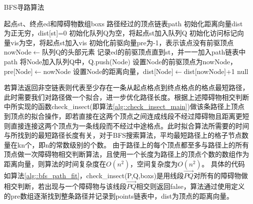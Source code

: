 \begin{algorithm}[!htb]
    \caption{BFS寻路算法}
    \label{alg::bfs_find_path}
    \begin{algorithmic}[1]
        \Require 起点st、终点ed和障碍物数组boxs
        \Ensure 路径经过的顶点链表path
            \State 初始化距离向量dist为正无穷，dist[st]=0
            \State 初始化队列Q为空，将起点st加入队列Q
            \State 初始化访问标记向量vis为空，将起点st加入vis
            \State 初始化前驱向量pre为-1，表示该点没有前驱顶点
                \State nowNode$\gets$队列Q的头部元素
                    \State 记录ed的前驱顶点直到st，并一一加入path链表中
                    \State \Return path
                \EndIf
                        \State 将Node加入队列Q中，Q.push(Node)
                        \State 设置Node的前驱顶点为nowNode，pre[Node]$\gets$nowNode
                        \State 设置Node的距离向量，dist[Node]$\gets$dist[nowNode]+1
                    \EndIf
                \EndWhile
            \EndWhile
            \State \Return null
        \EndFunction
    \end{algorithmic}
\end{algorithm}
\par 若算法返回非空链表则代表至少存在一条从起点格点到终点格点的格点最短路径，此时需要我们对路径做一个拟合，进一步优化路径长度。根据上述障碍物相交判断中所实现的函数check\_insect(即算法\ref{alg::check_insect_main})做该条路径上顶点到顶点的拟合操作，即若直接在这两个顶点之间连成线段不经过障碍物且距离更短则直接连接这两个顶点为一条线段而不经过中途格点。此时拟合算法所需要的时间与所找到的最短路径长度有关，对于BFS搜索算法，平均最短路径上的格子节点数量在kn个，即n的常数级别的个数。
由于路径上的每个顶点都至多与路径上的所有顶点做一次障碍物相交判断算法，且使用一个长度为路径上的顶点个数的数组作为距离向量，则算法的时间复杂度在$O(n^2)$，空间复杂度为$O(n^2)$。
具体的代码如算法\ref{alg::bfs_path_fit}，check\_insect(P,Q,boxs)是用线段$\vec{PQ}$对所有的障碍物做相交判断，若出现与一个障碍物与该线段$\vec{PQ}$相交则返回false，算法通过使用定义的pre数组逐渐找到整条路径并记录到points链表中，dist为顶点的距离向量。
%
